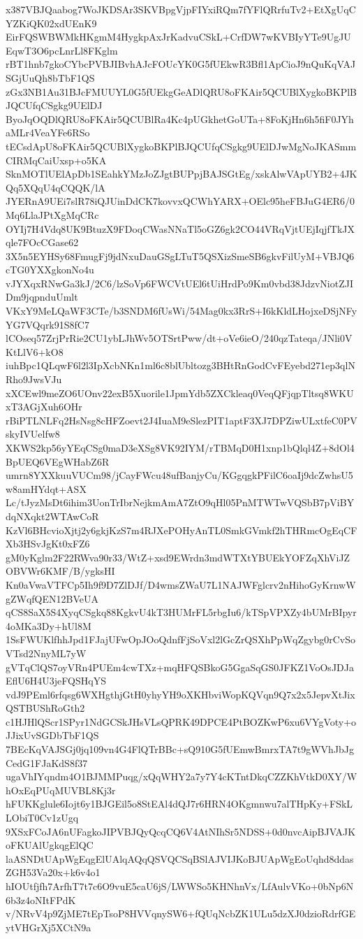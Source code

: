 x387VBJQaabog7WoJKDSAr3SKVBpgVjpFIYxiRQm7fYFlQRrfuTv2+EtXgUqCYZKiQK02xdUEnK9
EirFQSWBWMkHKgmM4HygkpAxJrKadvuCSkL+CrfDW7wKVBIyYTe9UgJUEqwT3O6pcLnrLl8FKglm
rBT1hnb7gkoCYbcPVBJIBvhAJcFOUcYK0G5fUEkwR3Bfl1ApCioJ9nQuKqVAJSGjUuQh8bTbF1QS
zGx3NB1Au31BJcFMUUYL0G5fUEkgGeADlQRU8oFKAir5QCUBlXygkoBKPlBJQCUfqCSgkg9UElDJ
ByoJqOQDlQRU8oFKAir5QCUBlRa4Kc4pUGkhetGoUTa+8FoKjHn6h5fiF0JYhaMLr4VeaYFe6RSo
tECsdApU8oFKAir5QCUBlXygkoBKPlBJQCUfqCSgkg9UElDJwMgNoJKASmmCIRMqCaiUxsp+o5KA
SknMOTlUElApDb1SEahkYMzJoZJgtBUPpjBAJSGtEg/xskAlwVApUYB2+4JKQq5XQqU4qCQQK/lA
JYERnA9UEi7slR78iQJUinDdCK7kovvxQCWhYARX+OElc95heFBJuG4ER6/0Mq6LlaJPtXgMqCRc
OYIj7H4Vdq8UK9BtuzX9FDoqCWasNNaTl5oGZ6gk2CO44VRqVjtUEjIqjfTkJXqle7FOcCGase62
3X5n5EYHSy68FmugFj9jdNxuDauGSgLTuT5QSXizSmeSB6gkvFilUyM+VBJQ6cTG0YXXgkonNo4u
vJYXqxRNwGa3kJ/2C6/lzSoVp6FWCVtUEl6tUiHrdPo9Km0vbd38JdzvNiotZJIDm9jqpnduUmlt
VKxY9MeLQaWF3CTe/b3SNDM6fUsWi/54Mag0kx3RrS+I6kKldLHojxeDSjNFyYG7VQqrk91S8fC7
lCOseq57ZrjPrRie2CU1ybLJhWv5OTSrtPww/dt+oVe6ieO/240qzTateqa/JNli0VKtLlV6+kO8
iuhBpc1QLqwF6l2l3IpXcbNKn1ml6c8blUbltozg3BHtRnGodCvFEyebd271ep3qlNRho9JwsVJu
xXCEwl9meZO6UOnv22exB5Xuorile1JpmYdb5ZXCkleaq0VeqQFjqpTltsq8WKUxT3AGjXuh6OHr
rBiPTLNLFq2HsNsg8cHFZoevt2J4IuaM9eSlezPIT1aptF3XJ7DPZiwULxtfeC0PVskyIVUelfw8
XKWS2kp56yYEqCSg0maD3eXSg8VK92IYM/rTBMqD0H1xnp1bQlql4Z+8dOl4BpUEQ6VEgWHabZ6R
umrn8YXXkuuVUCm98/jCayFWcu48ufBanjyCu/KGgqgkPFilC6oaIj9dcZwhsU5w8amHYdqt+ASX
Lc/tJyzMsDt6ihim3UonTrIbrNejkmAmA7ZtO9qHl05PnMTWTwVQSbB7pViBYdqNXqkt2WTAwCoR
KzVl6BHcvioXjtj2y6gkjKzS7m4RJXePOHyAnTL0SmkGVmkf2hTHRmcOgEqCFXb3HSvJgKt0xFZ6
gM0yKglm2F22RWva90r33/WtZ+xsd9EWrdn3mdWTXtYBUEkYOFZqXhViJZOBVWr6KMF/B/ygksHI
Kn0aVwaVTFCp5Ih9f9D7ZlDJf/D4wmsZWaU7L1NAJWFglcrv2nHihoGyKrnwWgZWqfQEN12BVeUA
qCS8SaX5S4XyqCSgkq88KgkvU4kT3HUMrFL5rbgIu6/kTSpVPXZy4bUMrBIpyr4oMKa3Dy+hUl8M
1SsFWUKlfhhJpd1FJajUFwOpJOoQdnfFjSoVxl2lGcZrQSXhPpWqZgybg0rCvSoVTsd2NnyML7yW
gVTqClQS7oyVRn4PUEm4cwTXz+mqHFQSBkoG5GgaSqGS0JFKZ1VoOsJDJaEflU6H4U3jeFQSHqYS
vdJ9PEml6rfqsg6WXHgthjGtH0yhyYH9oXKHbviWopKQVqn9Q7x2x5JepvXtJixQSTBUShRoGth2
c1HJHlQScr1SPyr1NdGCSkJHsVLsQPRK49DPCE4PtBOZKwP6xu6VYgVoty+oJJixUvSGDbTbF1QS
7BEcKqVAJSGj0jq109vn4G4FlQTrBBc+sQ910G5fUEmwBmrxTA7t9gWVhJbJgCedG1FJaKdS8f37
ugaVhIYqndm4O1BJMMPuqg/xQqWHY2a7y7Y4cKTntDkqCZZKhVtkD0XY/WhOxEqPUqMUVBL8Kj3r
hFUKKglule6Iojt6y1BJGEil5o8StEAl4dQJ7r6HRN4OKgmnwu7alTHpKy+FSkLLObiT0Cv1zUgq
9XSxFCoJA6nUFagkoJIPVBJQyQcqCQ6V4AtNIhSr5NDSS+0d0nvcAipBJVAJKoFKUAlUgkqgElQC
laASNDtUApWgEqgElUAlqAQqQSVQCSqBSlAJVIJKoBJUApWgEoUqhd8ddasZGH53Va20x+k6v4o1
hIOUtfjfh7ArfhT7t7c6O9vuE5caU6jS/LWWSo5KHNhnVx/LfAulvVKo+0bNp6N6b3z4oNItFPdK
v/NRvV4p9ZjME7tEpTsoP8HVVqnySW6+fQUqNcbZK1ULu5dzXJ0dzioRdrfGEytVHGrXj5XCtN9a
